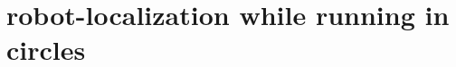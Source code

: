 \documentclass[class=article, crop=false]{standalone}
\begin{document}
\section{robot-localization while running in circles}\label{sec:exp-circle}
\end{document}
